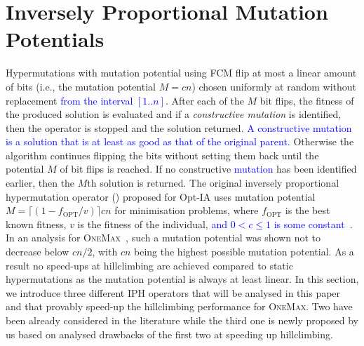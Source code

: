 \documentclass[lettersize,journal]{IEEEtran}
\newcommand{\new}[1]{\textcolor{blue}{#1}}
\begin{document}





 
 
 
 \section{Inversely Proportional Mutation Potentials} %
 Hypermutations with mutation potential using FCM flip at most a linear amount of bits (i.e., the mutation potential $M=cn$) chosen uniformly at random without replacement \new{from the interval $[1..n]$}. After each of the $M$ bit flips, the fitness of the produced solution is evaluated and if a {\it constructive mutation} is identified, then the operator is stopped and the solution returned. \new{A  constructive mutation is a solution that is at least as good as that of the original parent.}
 Otherwise the algorithm continues flipping the bits without setting them back until the potential $M$ of bit flips is reached. If no constructive \new{mutation} has been identified earlier, then the $M$th solution is returned.  
 The original inversely proportional hypermutation operator (\IPHfcm{}) proposed for Opt-IA uses mutation potential  $M=\lceil(1-f_{\text{OPT}}/v)\rceil cn$ for minimisation problems, where $f_{\text{OPT}}$ is the best known fitness, $v$ is the fitness of the individual, 
 \new{and $0<c\leq 1$ is some constant}~\cite{CutelloNicosiaPavoneTimmis2007,JansenZarges2011}. 
 In an analysis for \textsc {OneMax}~\cite{JansenZarges2011}, such a mutation potential was shown not to decrease below $cn/2$, with $cn$ being the highest possible mutation potential.
 	As a result no speed-ups at hillclimbing are achieved compared to static hypermutations as the mutation potential is always at least linear.
 In this section, we introduce three different IPH operators  that will be analysed in this paper and that provably speed-up the hillclimbing  performance for \textsc{OneMax}. Two have been already considered in the literature %
 while the third one is newly proposed by us based on analysed drawbacks of the first two at speeding up hillclimbing.
 
\end{document}
